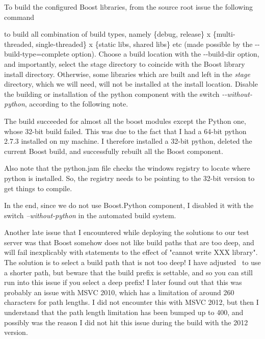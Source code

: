 \documentclass[10pt,a4paper]{article}
\begin{document}
To build the configured Boost libraries, from the source root issue the
following command

\begin{center}
\end{center}

\noindent to build all combination of build types, namely \{debug,  release\} x
\{multi-threaded, single-threaded\} x \{static libs, shared libs\} etc (made
possible by the {-}-build-type=complete option). Choose a build location with
the {-}-build-dir option, and importantly, select the stage directory to
coincide with the Boost library install directory. Otherwise, some libraries
which are built and left in the \textit{stage} directory, which we will need,
will not be installed at the install location.  Disable the
building or installation of the python component with the switch
\textit{{-}-without-python}, according to the following note.  

\begin{parchment}[Note]
The build succeeded for almost all the boost modules except the Python one,
whose 32-bit build failed. This was due to the fact that I had a 64-bit python
2.7.3 installed on my machine. I therefore installed a 32-bit python, deleted
the current Boost build, and successfully rebuilt all the Boost component. 

Also note that the python.jam file checks the windows registry to locate where
python is installed. So, the registry needs to be pointing to the 32-bit version
to get things to compile.

In the end, since we do not use Boost.Python component, I disabled it with the
switch \textit{--without-python} in the automated build system.

Another late issue that I encountered while deploying the solutions to our test
server was that Boost somehow does not like build paths that are too deep, and
will fail inexplicably with statements to the effect of "cannot write XXX
library". The solution is to select a build path that is not too deep! I have
adjusted \chastelibbuilder\ to use a shorter path, but beware that the build
prefix is settable, and so you can still run into this issue if you select a
deep prefix! I later found out that this was probably an issue with MSVC 2010,
which has a limitation of around 260 characters for path lengths. I did not
encounter this with MSVC 2012, but then I understand that the path length
limitation has been bumped up to 400, and possibly was the reason I did not hit
this issue during the build with the 2012 version.  
   
\end{parchment}
\end{document}
